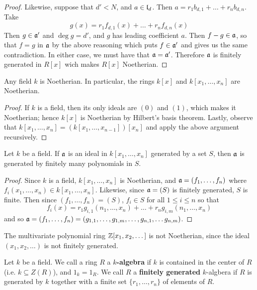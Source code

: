 \begin{proof}
  Likewise, suppose that $d'<N$, and  $a \in \mathfrak{l}_d$. Then
  $a=r_1b_{d,1}+\dots+r_nb_{d,n}$. Take
  \begin{equation*}
    g(x)=r_1f_{d,1}(x)+\dots+r_nf_{d,n}(x)
  \end{equation*}
  Then $g \in \mathfrak{a}'$ and $\deg{g}=d'$, and $g$ has leading coefficient
  $a$. Then $f-g \in \mathfrak{a}$, so that $f=g$ in $\mathfrak{a}$ by the above
  reasoning which puts  $f \in \mathfrak{a}'$ and gives us the same
  contradiction. In either case, we must have that $\mathfrak{a}=\mathfrak{a}'$.
  Therefore $\mathfrak{a}$ is finitely generated in $R[x]$ wich makes $R[x]$
  Noetherian.
\end{proof}
\begin{corollary}
  Any field $k$ is Noetherian. In particular, the rings $k[x]$ and
  $k[x_1, \dots, x_n]$ are Noetherian.
\end{corollary}
\begin{proof}
  If $k$ is a field, then its only ideals are $(0)$ and $(1)$, which
  makes it Noetherian; hence $k[x]$ is Noetherian by Hilbert's basis
  theorem. Lastly, observe that $k[x_1, \dots, x_n]=(k[x_1, \dots,
  x_{n-1}])[x_n]$ and apply the above argument recursively.
\end{proof}
\begin{corollary}
  Let $k$ be a field. If $\mathfrak{a}$ is an ideal in $k[x_1, \dots, x_n]$ generated
  by a set $S$, then $\mathfrak{a}$ is generated by finitely many polynomials in $S$.
\end{corollary}
\begin{proof}
  Since $k$ is a field, $k[x_1, \dots, x_n]$ is Noetherian, and
  $\mathfrak{a}=(f_1, \dots, f_n)$ where $f_i(x_1, \dots ,x_n) \in k[x_1,
  \dots, x_n]$. Likewise, since $\mathfrak{a}=(S)$ is finitely generated, $S$
  is finite. Then since $(f_1, \dots, f_n)=(S)$, $f_i \in S$ for all
  $1 \leq i \leq n$ so that
  \begin{equation*}
    f_i(x)=r_1g_{i,1}(n_1, \dots, x_n)+\dots+r_ng_{i,m}(n_1, \dots, x_n)
  \end{equation*}
  and so $\mathfrak{a}=(f_1, \dots, f_n)=(g_{1,1}, \dots ,g_{1,m}, \dots,
  g_{n,1}, \dots g_{n,m})$.
\end{proof}

\begin{example}\label{example_5.24}
  The multivariate polynomial ring $\mathbb{Z}[x_1, x_2, \dots]$ is not
  Noetherian, since the ideal $(x_1, x_2, \dots)$ is not finitely
  generated.
\end{example}

\begin{definition}
  Let $k$ be a field. We call a ring  $R$ a \textbf{$k$-algebra} if $k$ is
  contained in the center of  $R$  (i.e. $k \subseteq Z(R)$), and $1_k=1_R$.
  We call  $R$ a  \textbf{finitely generated} $k$-algbera if $R$ is generated
  by  $k$ together with a finite set $\{r_1, \dots, r_n\}$ of elements of
  $R$.
\end{definition}

